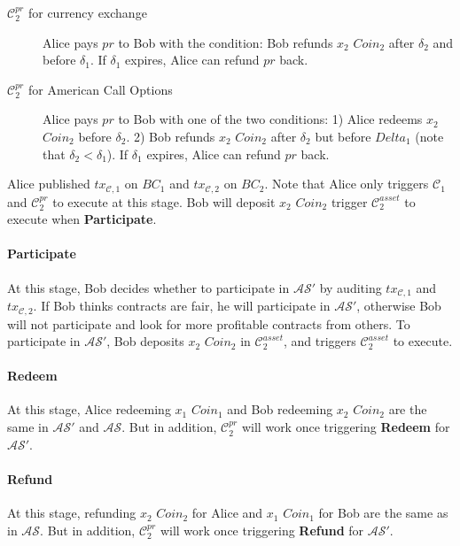 \begin{description}
    \item[$\mathcal{C}^{pr}_2$ for currency exchange] Alice pays $pr$ to Bob with the condition:
    Bob refunds $x_2$ $Coin_2$ after $\delta_2$ and before $\delta_1$.
    If $\delta_1$ expires, Alice can refund $pr$ back.
    \item[$\mathcal{C}^{pr}_2$ for American Call Options] Alice pays $pr$ to Bob with one of the two conditions:
    1) Alice redeems $x_2$ $Coin_2$ before $\delta_2$.
    2) Bob refunds $x_2$ $Coin_2$ after $\delta_2$ but before $Delta_1$ (note that $\delta_2 < \delta_1$).
    If $\delta_1$ expires, Alice can refund $pr$ back.
\end{description}

Alice published $tx_{\mathcal{C}, 1}$ on $BC_1$ and $tx_{\mathcal{C}, 2}$ on $BC_2$.
Note that Alice only triggers $\mathcal{C}_1$ and $\mathcal{C}^{pr}_2$ to execute at this stage.
Bob will deposit $x_2$ $Coin_2$ trigger $\mathcal{C}^{asset}_2$ to execute when \textbf{Participate}.

\paragraph{\textbf{Participate}}
At this stage, Bob decides whether to participate in $\mathcal{AS}'$ by auditing $tx_{\mathcal{C}, 1}$ and $tx_{\mathcal{C}, 2}$.
If Bob thinks contracts are fair, he will participate in $\mathcal{AS}'$, otherwise Bob will not participate and look for more profitable contracts from others.
To participate in $\mathcal{AS}'$, Bob deposits $x_2$ $Coin_2$ in $\mathcal{C}^{asset}_2$, and triggers $\mathcal{C}^{asset}_2$ to execute.

\paragraph{\textbf{Redeem}}
At this stage, Alice redeeming $x_1$ $Coin_1$ and Bob redeeming $x_2$ $Coin_2$ are the same in $\mathcal{AS}'$ and $\mathcal{AS}$.
But in addition, $\mathcal{C}^{pr}_2$ will work once triggering \textbf{Redeem} for $\mathcal{AS}'$.

\paragraph{\textbf{Refund}}
At this stage, refunding $x_2$ $Coin_2$ for Alice and $x_1$ $Coin_1$ for Bob are the same as in $\mathcal{AS}$.
But in addition, $\mathcal{C}^{pr}_2$ will work once triggering \textbf{Refund} for $\mathcal{AS}'$.